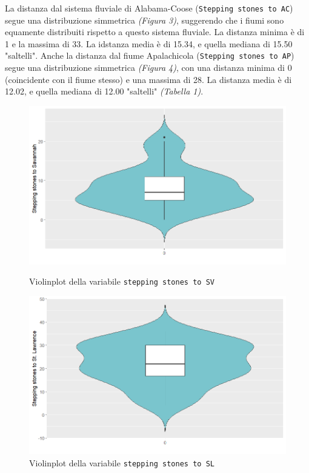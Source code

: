 \documentclass{article} %
\begin{document}
La distanza dal sistema fluviale di Alabama-Coose (\texttt{Stepping stones to AC}) segue una distribuzione simmetrica \textit{(Figura 3)}, suggerendo che i fiumi sono equamente distribuiti rispetto a questo sistema fluviale. La distanza minima è di 1 e la massima di 33. La idstanza media è di 15.34, e quella mediana di 15.50 "saltelli".
Anche la distanza dal fiume Apalachicola (\texttt{Stepping stones to AP}) segue una distribuzione simmetrica \textit{(Figura 4)}, con una distanza minima di 0 (coincidente con il fiume stesso) e una massima di 28. La distanza media è di 12.02, e quella mediana di 12.00 "saltelli" \textit{(Tabella 1)}.

\begin{figure}[H]
    \centering
    \begin{minipage}{0.49\textwidth}
        \centering
        \includegraphics[width=\textwidth]{immagini/vp_sv.png}
        \captionsetup{justification=centering}
        \caption{Violinplot della variabile \texttt{stepping stones to SV}}
    \end{minipage}
    \hfill
    \begin{minipage}{0.49\textwidth}
        \centering
        \includegraphics[width=\textwidth]{immagini/vp_sl.png}
        \captionsetup{justification=centering}
        \caption{Violinplot della variabile \texttt{stepping stones to SL}}
    \end{minipage}
\end{figure}
\end{document}
